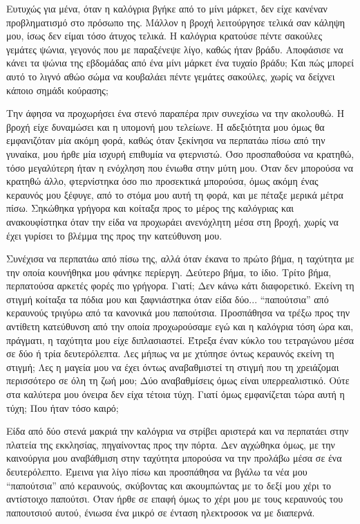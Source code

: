 \documentclass[12pt,twoside, openany]{book}
\begin{document}
Ευτυχώς για μένα, όταν η καλόγρια βγήκε από το μίνι μάρκετ, δεν είχε κανέναν προβληματισμό στο πρόσωπο της. Μάλλον η βροχή λειτούργησε τελικά σαν κάληψη μου, ίσως δεν είμαι τόσο άτυχος τελικά. Η καλόγρια κρατούσε πέντε σακούλες γεμάτες ψώνια, γεγονός που με παραξένεψε λίγο, καθώς ήταν βράδυ. Αποφάσισε να κάνει τα ψώνια της εβδομάδας από ένα μίνι μάρκετ ένα τυχαίο βράδυ; Και πώς μπορεί αυτό το λιγνό αθώο σώμα να κουβαλάει πέντε γεμάτες σακούλες, χωρίς να δείχνει κάποιο σημάδι κούρασης;

Την άφησα να προχωρήσει ένα στενό παραπέρα πριν συνεχίσω να την ακολουθώ. Η βροχή είχε δυναμώσει και η υπομονή μου τελείωνε. Η αδεξιότητα μου όμως θα εμφανιζόταν μία ακόμη φορά, καθώς όταν ξεκίνησα να περπατάω πίσω από την γυναίκα, μου ήρθε μία ισχυρή επιθυμία να φτερνιστώ. Όσο προσπαθούσα να κρατηθώ, τόσο μεγαλύτερη ήταν η ενόχληση που ένιωθα στην μύτη μου. Όταν δεν μπορούσα να κρατηθώ άλλο, φτερνίστηκα όσο πιο προσεκτικά μπορούσα, όμως ακόμη ένας κεραυνός μου ξέφυγε, από το στόμα μου  αυτή τη φορά, και με πέταξε μερικά μέτρα πίσω. Σηκώθηκα γρήγορα και κοίταξα προς το μέρος της καλόγριας και ανακουφίστηκα όταν την είδα να προχωράει ανενόχλητη μέσα στη βροχή, χωρίς να έχει γυρίσει το βλέμμα της προς την κατεύθυνση μου.

Συνέχισα να περπατάω από πίσω της, αλλά όταν έκανα το πρώτο βήμα, η ταχύτητα με την οποία κουνήθηκα μου φάνηκε περίεργη. Δεύτερο βήμα, το ίδιο. Τρίτο βήμα, περπατούσα αρκετές φορές πιο γρήγορα. Γιατί; Δεν κάνω κάτι διαφορετικό. Εκείνη τη στιγμή κοίταξα τα πόδια μου και ξαφνιάστηκα όταν είδα δύο... “παπούτσια” από κεραυνούς τριγύρω από τα κανονικά μου παπούτσια. Προσπάθησα να τρέξω προς την αντίθετη κατεύθυνση από την οποία προχωρούσαμε εγώ και η καλόγρια τόση ώρα και, πράγματι, η ταχύτητα μου είχε διπλασιαστεί. Έτρεξα έναν κύκλο του τετραγώνου μέσα σε δύο ή τρία δευτερόλεπτα. Λες μήπως να με χτύπησε όντως κεραυνός εκείνη τη στιγμή; Λες η μαγεία μου να έχει όντως αναβαθμιστεί τη στιγμή που τη χρειάζομαι περισσότερο σε όλη τη ζωή μου; Δύο αναβαθμίσεις όμως είναι υπερρεαλιστικό. Ούτε στα καλύτερα μου όνειρα δεν είχα τέτοια τύχη. Γιατί όμως εμφανίζεται τώρα αυτή η τύχη; Που ήταν τόσο καιρό;

Είδα από δύο στενά μακριά την καλόγρια να στρίβει αριστερά και να περπατάει στην πλατεία της εκκλησίας, πηγαίνοντας προς την πόρτα. Δεν αγχώθηκα όμως, με την καινούργια μου αναβάθμιση στην ταχύτητα μπορούσα να την προλάβω μέσα σε ένα δευτερόλεπτο. Έμεινα για λίγο πίσω και προσπάθησα να βγάλω τα νέα μου “παπούτσια” από κεραυνούς, σκύβοντας και ακουμπώντας με το δεξί μου χέρι το αντίστοιχο παπούτσι. Όταν ήρθε σε επαφή όμως το χέρι μου με τους κεραυνούς του παπουτσιού αυτού, ένιωσα ένα μικρό σε ένταση ηλεκτροσοκ να με διαπερνά.
\end{document}
